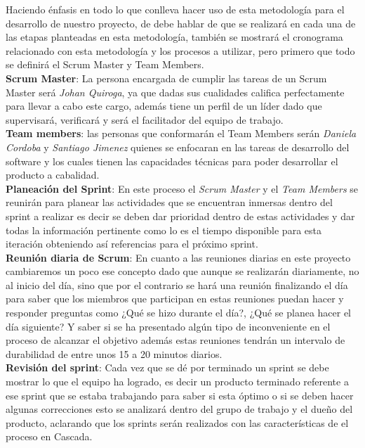 Haciendo énfasis en todo lo que conlleva hacer uso de esta metodología para el desarrollo de nuestro proyecto, de debe hablar de que se realizará en cada una de las etapas planteadas en esta metodología, también se mostrará el cronograma relacionado con esta metodología y los procesos a utilizar, pero primero que todo se definirá el Scrum Master y Team Members.\\

\textbf{Scrum Master}: La persona encargada de cumplir las tareas de un Scrum Master será \textit{Johan Quiroga}, ya que dadas sus cualidades califica perfectamente para llevar a cabo este cargo, además tiene un perfil de un líder dado que supervisará, verificará y será el facilitador del equipo de trabajo.\\

\textbf{Team members}: las personas que conformarán el Team Members serán \textit{Daniela Cordoba} y \textit{Santiago Jimenez} quienes se enfocaran en las tareas de desarrollo del software y los cuales tienen las capacidades técnicas para poder desarrollar el producto a cabalidad.\\

\textbf{Planeación del Sprint}: En este proceso el \textit{Scrum Master} y el \textit{Team Members} se reunirán para planear las actividades que se encuentran inmersas dentro del sprint a realizar es decir se deben dar prioridad dentro de estas actividades y dar todas la información pertinente como lo es el tiempo disponible para esta iteración obteniendo así referencias para el próximo sprint.\\

\textbf{Reunión diaria de Scrum}: En cuanto a las reuniones diarias en este proyecto cambiaremos un poco ese concepto dado que aunque se realizarán diariamente, no al inicio del día, sino que por el contrario se hará una reunión finalizando el día para saber que los miembros que participan en estas reuniones puedan hacer y responder preguntas como ¿Qué se hizo durante el día?, ¿Qué se planea hacer el día siguiente? Y saber si se ha presentado algún tipo de inconveniente en el proceso de alcanzar el objetivo además estas reuniones tendrán un intervalo de durabilidad de entre unos 15 a 20 minutos diarios.\\

\textbf{Revisión del sprint}: Cada vez que se dé por terminado un sprint se debe mostrar lo que el equipo ha logrado, es decir un producto terminado referente a ese sprint que se estaba trabajando para saber si esta óptimo o si se deben hacer algunas correcciones esto se analizará dentro del grupo de trabajo y el dueño del producto, aclarando que los sprints serán realizados con las características de el proceso en Cascada.

